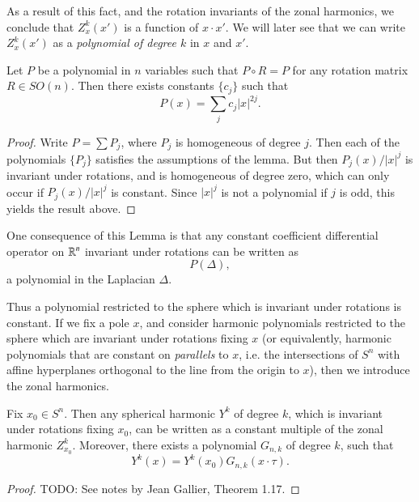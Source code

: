 As a result of this fact, and the rotation invariants of the zonal harmonics, we conclude that $Z^k_x(x')$ is a function of $x \cdot x'$. We will later see that we can write $Z^k_x(x')$ as a \emph{polynomial of degree $k$} in $x$ and $x'$.

\begin{lemma}
    Let $P$ be a polynomial in $n$ variables such that $P \circ R = P$ for any rotation matrix $R \in SO(n)$. Then there exists constants $\{ c_j \}$ such that
    \[ P(x) = \sum_j c_j |x|^{2j}. \]
\end{lemma}
\begin{proof}
    Write $P = \sum P_j$, where $P_j$ is homogeneous of degree $j$. Then each of the polynomials $\{ P_j \}$ satisfies the assumptions of the lemma. But then $P_j(x) / |x|^j$ is invariant under rotations, and is homogeneous of degree zero, which can only occur if $P_j(x) / |x|^j$ is constant. Since $|x|^j$ is not a polynomial if $j$ is odd, this yields the result above.
\end{proof}

\begin{remark}
    One consequence of this Lemma is that any constant coefficient differential operator on $\operatorname{\mathbb{R}}^n$ invariant under rotations can be written as
    \[ P(\Delta), \]
    a polynomial in the Laplacian $\Delta$.
\end{remark}

Thus a polynomial restricted to the sphere which is invariant under rotations is constant. If we fix a pole $x$, and consider harmonic polynomials restricted to the sphere which are invariant under rotations fixing $x$ (or equivalently, harmonic polynomials that are constant on \emph{parallels} to $x$, i.e. the intersections of $S^n$ with affine hyperplanes orthogonal to the line from the origin to $x$), then we introduce the zonal harmonics.

\begin{theorem}
    Fix $x_0 \in S^n$. Then any spherical harmonic $Y^k$ of degree $k$, which is invariant under rotations fixing $x_0$, can be written as a constant multiple of the zonal harmonic $Z^k_{x_0}$. Moreover, there exists a polynomial $G_{n,k}$ of degree $k$, such that
    \[ Y^k(x) = Y^k(x_0) G_{n,k}( x \cdot \tau ). \]
\end{theorem}
\begin{proof}
    TODO: See notes by Jean Gallier, Theorem 1.17.
\end{proof}

